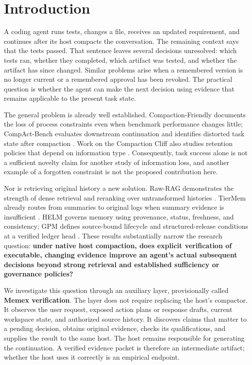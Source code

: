 \section{Introduction}\label{introduction}

A coding agent runs tests, changes a file, receives an updated
requirement, and continues after its host compacts the conversation. The
remaining context says that the tests passed. That sentence leaves
several decisions unresolved: which tests ran, whether they completed,
which artifact was tested, and whether the artifact has since changed.
Similar problems arise when a remembered version is no longer current or
a remembered approval has been revoked. The practical question is
whether the agent can make the next decision using evidence that remains
applicable to the present task state.

The general problem is already well established. Compaction-Friendly
documents the loss of process constraints even when benchmark
performance changes little; CompAct-Bench evaluates downstream
continuation and identifies distorted task state after compaction
\citep{salle2026compactionfriendly, chen2026compactbench}. Work on the
Compaction Cliff also studies retention policies that depend on
information type \citep{zerhoudi2026compactioncliff}. Consequently, task
success alone is not a sufficient novelty claim for another study of
information loss, and another example of a forgotten constraint is not
the proposed contribution here.

Nor is retrieving original history a new solution. Raw-RAG demonstrates
the strength of dense retrieval and reranking over untransformed
histories \citep{bao2026rawrag}. TierMem already routes from summaries
to original logs when summary evidence is insufficient
\citep{zhu2026tiermem}. HELM governs memory using provenance, status,
freshness, and consistency; GPM defines source-bound lifecycle and
structured-release conditions at a verified ledger head
\citep{liu2026helm, xu2026gpm}. These results substantially narrow the
research question: \textbf{under native host compaction, does explicit
verification of executable, changing evidence improve an agent's actual
subsequent decisions beyond strong retrieval and established sufficiency
or governance policies?}

We investigate this question through an auxiliary layer, provisionally
called \textbf{Memex verification}. The layer does not require replacing
the host's compactor. It observes the user request, exposed action plans
or response drafts, current workspace state, and authorized source
history. It discovers claims that matter to a pending decision, obtains
original evidence, checks its qualifications, and supplies the result to
the same host. The host remains responsible for generating the
continuation. A verified evidence packet is therefore an intermediate
artifact; whether the host uses it correctly is an empirical endpoint.

